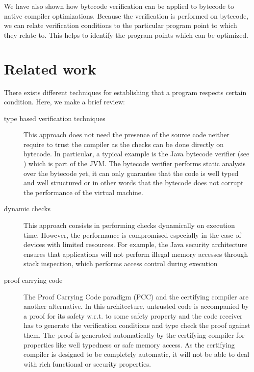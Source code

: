 We have also shown how bytecode verification can be applied to  bytecode to native compiler optimizations. Because the verification is performed
on bytecode, we can relate verification conditions to the particular program point to which they relate to. This helps to identify
the program points which can be optimized. 

\section{Related work}

There exists different techniques for establishing that a program respects certain condition. Here, we make a brief review:

\begin{description}
  
  

   \item [type based verification techniques] 
     This approach does not need the presence of the source code neither require to trust the compiler as
     the checks can be done directly on bytecode. In particular, a typical example is the Java bytecode
     verifier (see \cite{Ljbc}) which is part of the JVM. The bytecode verifier performs static analysis over the bytecode yet,
     it can only guarantee that  the code is well typed and well structured or in other words that the
     bytecode does not corrupt the performance of the virtual machine. 

   \item [dynamic checks] This approach consists in performing checks dynamically on execution time.    
     However, the performance is compromised especially in the case of 
     devices with limited resources.  For example,
     the Java security architecture ensures that applications will not
     perform illegal memory accesses through stack inspection, which
     performs access control during execution
   
   \item[proof carrying code]
     The Proof Carrying Code paradigm (PCC) and the certifying compiler \cite{DesNecLee98} are another alternative.
     In this architecture, untrusted code
     is accompanied by a proof for its safety w.r.t. to some safety property and the code receiver has  to generate the 
     verification conditions and type check the proof against them. 
     The proof is generated automatically by the certifying compiler for properties like well typedness or safe memory access. 
     As the certifying compiler is designed to be completely automatic, it will not be able to deal with rich functional or security properties. 
     

\end{description}
